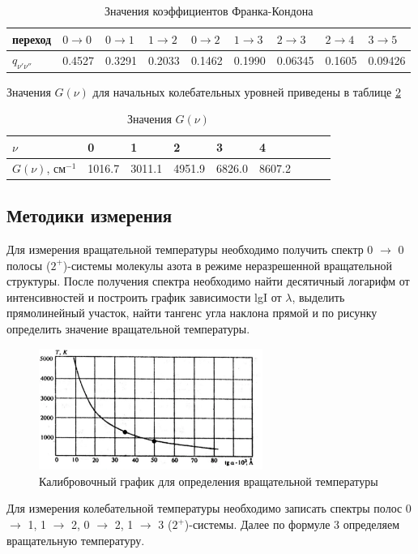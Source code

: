 \begin{table}[H]
	\centering
	\caption{Значения коэффициентов Франка-Кондона}
	\begin{tabular}{ | l | l | l | l | l | l | l | l | l | }
		\hline
		переход & $0 \rightarrow 0$ & $0 \rightarrow 1$ & $1 \rightarrow 2$ & $0 \rightarrow 2$ & $1 \rightarrow 3$ & $2 \rightarrow 3$ & $2 \rightarrow 4$ & $3 \rightarrow 5$ \\ \hline
		$q_{\nu' \nu''}$ & 0.4527 & 0.3291 & 0.2033 & 0.1462 & 0.1990 & 0.06345 & 0.1605 & 0.09426 \\ \hline
	\end{tabular}
	\label{tab:frank-koeffs}
\end{table}

Значения $G(\nu)$ для начальных колебательных уровней приведены в таблице \ref{tab:G_table}

\begin{table}[H]
	\centering
	\caption{Значения $G(\nu)$}
	\begin{tabular}{ | l | l | l | l | l | l | l | l | l | }
		\hline
		$\nu$ & 0 & 1 & 2 & 3 & 4 \\ \hline
		$G(\nu)$, см$^{-1}$ & 1016.7 & 3011.1 & 4951.9 & 6826.0 & 8607.2 \\ \hline
	\end{tabular}
	\label{tab:G_table}
\end{table}


\subsection{Методики измерения}
Для измерения вращательной температуры необходимо получить спектр 0 $\rightarrow $ 0 полосы ($2^+$)-системы молекулы азота в режиме неразрешенной вращательной структуры. После получения спектра необходимо найти десятичный логарифм от интенсивностей и построить график зависимости lgI от $\lambda$, выделить прямолинейный участок, найти тангенс угла наклона прямой и по рисунку  определить значение вращательной температуры.
\begin{figure}[H]
	\begin{center}
		\includegraphics[width=0.65\textwidth]{kalibr.png}
		\caption{Калибровочный график для определения вращательной температуры}
		\label{scheme}
	\end{center}	
\end{figure}
Для измерения колебательной температуры необходимо записать спектры полос 0 $\rightarrow $ 1, 1 $\rightarrow $ 2, 0 $\rightarrow $ 2, 1 $\rightarrow $ 3 ($2^{+}$)-системы. Далее по формуле 3 определяем вращательную температуру.